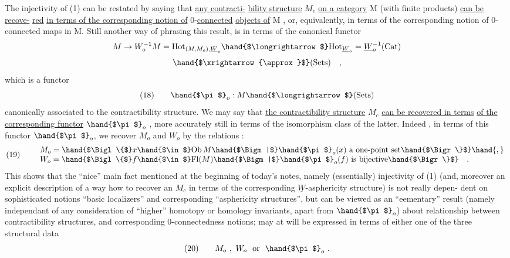 The injectivity of (1) can be restated by saying that \uline{any contracti-}%
\uline{bility structure} $M_c$ \uline{on a category} M (with finite products) \uline{can be recove-}%
\uline{red} \uline{in terms of the corresponding notion of} 0-\uline{connected} \uline{objects of} M ,
or, equivalently, in terms of the corresponding notion of 0-connected
maps in M. Still another way of phrasing this result, is in terms of
the canonical functor
\[
M\to W_o^{-1}M = \mathrm{Hot}_{(M,M_o),\underline{W}_o} \hand{$\longrightarrow$} \mathrm{Hot}_{\underline{W}_o} = \underline{W}_o^{-1}(\mathrm{Cat})
\]
\[
\hand{$\xrightarrow{\approx}$} (\mathrm{Sets}) \quad ,
\]
which is a functor
\[
(18)\qquad \hand{$\pi$}_o : M \hand{$\longrightarrow$} (\mathrm{Sets})
\]
canonically associated to the contractibility structure. We may say that
\uline{the contractibility structure} $M_c$  \uline{can be recovered in terms}
\uline{of the corresponding functor} $\hand{$\pi$}_o$ , more accurately still in terms of the
isomorphism class of the latter. Indeed , in terms of this functor $\hand{$\pi$}_o$,
we recover $M_o$ and $W_o$ by the  relations :
\[
(19)\qquad
\begin{array}{l}
M_o = \hand{$\Bigl\{$} x \hand{$\in$} \mathrm{Ob}\, M \hand{$\Bigm|$} \hand{$\pi$}_o(x) \text{ a one-point set}\hand{$\Bigr\}$}\hand{,}\\
W_o = \hand{$\Bigl\{$} f \hand{$\in$} \mathrm{Fl}(M) \hand{$\Bigm|$} \hand{$\pi$}_o(f) \text{ is bijective}\hand{$\Bigr\}$} \quad .
\end{array}
\]
This shows that the ``nice'' main fact mentioned at the beginning of
today's notes, namely (essentially) injectivity of (1) (and, moreover\unsure{,}
an explicit description of a way how to recover an $M_c$ in terms of the
corresponding  $\underline{W}$-asphericity structure) is  not really depen-%
dent on  sophisticated notions   ``basic localizers'' and corresponding
``asphericity structures'', but can be viewed as an ``eementary'' result
(namely independant of any consideration of ``higher'' homotopy or homology
invariants, apart from $\hand{$\pi$}_o$) about relationship between contractibility
structures, and corresponding 0-connectedness notions;   may at
will be expressed in terms of either one of the three structural data
\[
(20)\qquad M_o \ , \ W_o \ \text{ or } \ \hand{$\pi$}_o \ .
\]
